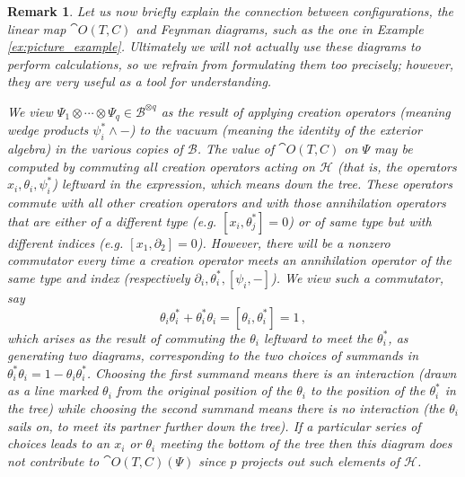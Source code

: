 \documentclass[english,letter paper,12pt,leqno]{article}
\theoremstyle{example}
\newtheorem{remark}[theorem]{Remark}
\numberwithin{equation}{section}
\begin{document}
\begin{remark} Let us now briefly explain the connection between configurations, the linear map $\cat{O}(T,C)$ and Feynman diagrams, such as the one in Example \ref{ex:picture_example}. Ultimately we will not actually use these diagrams to perform calculations, so we refrain from formulating them too precisely; however, they are very useful as a tool for understanding.

We view $\Psi_1 \otimes \cdots \otimes \Psi_q \in \mathscr{B}^{\otimes q}$ as the result of applying creation operators (meaning wedge products $\psi_i^* \wedge -$) to the vacuum (meaning the identity of the exterior algebra) in the various copies of $\mathscr{B}$. The value of $\cat{O}(T,C)$ on $\Psi$ may be computed by commuting all creation operators acting on $\mathscr{H}$ (that is, the operators $x_i, \theta_i, \psi_i^*$) leftward in the expression, which means \emph{down} the tree. These operators commute with all other creation operators and with those annihilation operators that are either of a different type (e.g. $[x_i, \theta_j^*] = 0$) or of same type but with different indices (e.g. $[x_1, \partial_2] = 0$). However, there will be a nonzero commutator every time a creation operator meets an annihilation operator of the same type and index (respectively $\partial_i, \theta_i^*, [\psi_i, -]$). We view such a commutator, say
\[
\theta_i \theta_i^* + \theta_i^* \theta_i = [ \theta_i, \theta_i^* ] = 1\,,
\]
which arises as the result of commuting the $\theta_i$ leftward to meet the $\theta_i^*$, as generating two diagrams, corresponding to the two choices of summands in $\theta_i^* \theta_i = 1 - \theta_i \theta_i^*$. Choosing the first summand means there is an interaction (drawn as a line marked $\theta_i$ from the original position of the $\theta_i$ to the position of the $\theta_i^*$ in the tree) while choosing the second summand means there is no interaction (the $\theta_i$ sails on, to meet its partner further down the tree). If a particular series of choices leads to an $x_i$ or $\theta_i$ meeting the bottom of the tree then this diagram does not contribute to $\cat{O}(T,C)(\Psi)$ since $p$ projects out such elements of $\mathscr{H}$. 


\end{remark}
\end{document}
